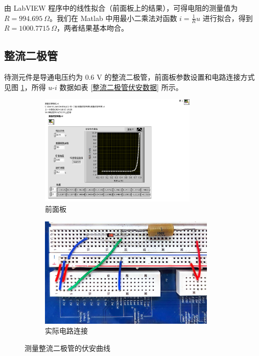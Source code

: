 \documentclass[UTF8]{article}
\def\kO{\ \mathrm{K}\Omega}
\theoremstyle{MyLineTheoremStyle} %
\theoremstyle{MyBlockTheoremStyle} %
\theoremstyle{MySubsubsectionStyle} %
\begin{document}
由 LabVIEW 程序中的线性拟合（前面板上的结果），可得电阻的测量值为 $R = 994.695\ \Omega$。我们在 Matlab 中用最小二乘法对函数 $i = \frac{1}{R}u$ 进行拟合，得到 $R = 1000.7715 \ \Omega$，两者结果基本吻合。


\newpage
\subsection{整流二极管}

待测元件是导通电压约为 0.6 V 的整流二极管，前面板参数设置和电路连接方式见图 \ref{测量整流二极管的伏安曲线}，所得 $u$-$i$ 数据如表 \ref{整流二极管伏安数据} 所示。

\begin{figure}[H]\centering
    \begin{subfigure}[b]{0.45\columnwidth}\centering
        \includegraphics[height=150pt]{assets/测量伏安曲线__整流二极管.pdf}
        \caption{前面板}
    \end{subfigure}\hfill
    \begin{subfigure}[b]{0.55\columnwidth}\centering
        \includegraphics[height=150pt]{assets/测量伏安曲线__整流二极管.jpg}
        \caption{实际电路连接}
    \end{subfigure}
    \caption{测量整流二极管的伏安曲线}
    \label{测量整流二极管的伏安曲线}
\end{figure}
\end{document}
